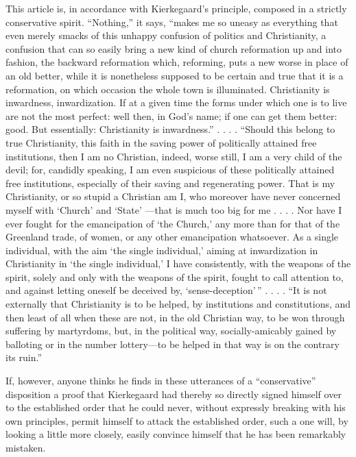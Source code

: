 \documentclass[12pt,a4paper]{article}
\newcommand{\opage}[1]{\marginnote{\footnotesize\textit{[#1]}}}
\begin{document}
This article is, in accordance with Kierkegaard's
principle, composed in a strictly conservative spirit. ``Nothing,''
it says, ``makes me so uneasy as everything
that even merely smacks of this unhappy confusion
of politics and Christianity, a confusion that can so easily
bring a new kind of church reformation up and into fashion,
the backward reformation which, reforming, puts a
new worse in place of an old better, while it
is nonetheless supposed to be certain and true that it is a reformation,
on which occasion the whole town is illuminated. Christianity
is inwardness, inwardization. If at a given
time the forms under which one is to live are not the most
perfect: well then, in God's name; if one can get them better:
\opage{22}good. But essentially: Christianity is inwardness.'' . . . .
``Should this belong to true Christianity, this faith
in the saving power of politically attained free institutions,
then I am no Christian, indeed, worse still, I am
a very child of the devil; for, candidly speaking, I am even
suspicious of these politically attained free institutions,
especially of their saving and regenerating power. That is
my Christianity, or so stupid a Christian am I, who
moreover have never concerned myself with `Church' and `State'
---that is much too big for me . . . . Nor have I
ever fought for the emancipation of `the Church,' any more than
for that of the Greenland trade, of women, or any
other emancipation whatsoever. As a single individual, with
the aim `the single individual,' aiming at inwardization in Christianity
in `the single individual,' I have consistently, with the weapons of the spirit,
solely and only with the weapons of the spirit, fought to call
attention to, and against letting oneself be deceived by, `sense-deception'\,''
. . . . ``It is not externally that Christianity
is to be helped, by institutions and constitutions, and then
least of all when these are not, in the old Christian way,
to be won through suffering by martyrdoms, but, in the political way,
socially-amicably gained by balloting or in
the number lottery---to be helped in that way is on the contrary
its ruin.''

If, however, anyone thinks he finds in these utterances of a
``conservative'' disposition a proof that
Kierkegaard had thereby so directly signed himself over
to the established order that he could never, without expressly breaking
with his own principles, permit himself
to attack the established order, such a one will, by
looking a little more closely, easily convince himself that he has
been remarkably mistaken.
\end{document}
